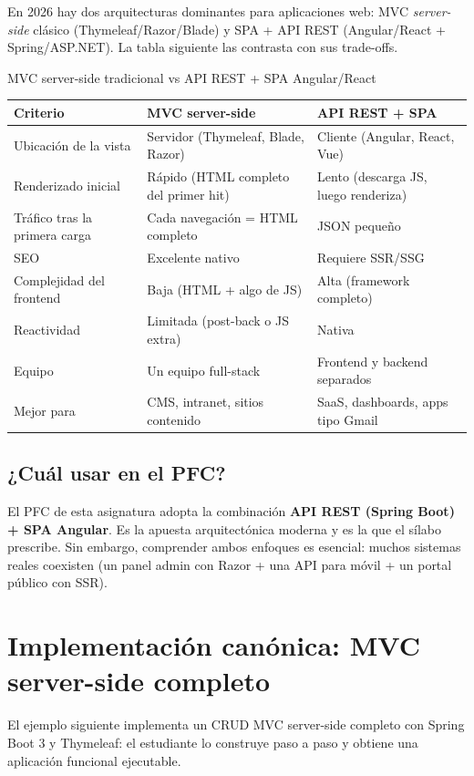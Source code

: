 \documentclass[11pt,a4paper,openany]{book}
\begin{document}
En 2026 hay dos arquitecturas dominantes para aplicaciones
web: MVC \emph{server-side} clásico (Thymeleaf/Razor/Blade) y SPA +
API REST (Angular/React + Spring/ASP.NET). La tabla siguiente las
contrasta con sus trade-offs.


\begin{cajacompara}{MVC server-side tradicional vs API REST + SPA Angular/React}
\centering\footnotesize
\begin{tabularx}{\textwidth}{lXX}
\toprule
\textbf{Criterio} & \textbf{MVC server-side} & \textbf{API REST + SPA}\\
\midrule
Ubicación de la vista & Servidor (Thymeleaf, Blade, Razor) & Cliente (Angular, React, Vue)\\
Renderizado inicial & Rápido (HTML completo del primer hit) & Lento (descarga JS, luego renderiza)\\
Tráfico tras la primera carga & Cada navegación = HTML completo & JSON pequeño\\
SEO & Excelente nativo & Requiere SSR/SSG\\
Complejidad del frontend & Baja (HTML + algo de JS) & Alta (framework completo)\\
Reactividad & Limitada (post-back o JS extra) & Nativa\\
Equipo & Un equipo full-stack & Frontend y backend separados\\
Mejor para & CMS, intranet, sitios contenido & SaaS, dashboards, apps tipo Gmail\\
\bottomrule
\end{tabularx}
\end{cajacompara}

\subsection{¿Cuál usar en el PFC?}

El PFC de esta asignatura adopta la combinación \textbf{API REST
(Spring Boot) + SPA Angular}. Es la apuesta arquitectónica moderna y
es la que el sílabo prescribe. Sin embargo, comprender ambos
enfoques es esencial: muchos sistemas reales coexisten (un panel
admin con Razor + una API para móvil + un portal público con SSR).

\section{Implementación canónica: MVC server-side completo}

El ejemplo siguiente implementa un CRUD MVC server-side
completo con Spring Boot 3 y Thymeleaf: el estudiante lo construye
paso a paso y obtiene una aplicación funcional ejecutable.
\end{document}
